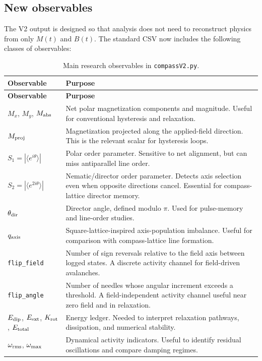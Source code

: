\documentclass[11pt,a4paper]{article}
\newcommand{\code}[1]{\texttt{#1}}
\begin{document}
\subsection{New observables}

The V2 output is designed so that analysis does not need to reconstruct physics from only $M(t)$ and $B(t)$. The standard CSV now includes the following classes of observables:

\begin{longtable}{@{}p{4.2cm}p{10.6cm}@{}}
\caption{Main research observables in \code{compassV2.py}.}\label{tab:v2obs}\\
\toprule
\textbf{Observable} & \textbf{Purpose}\\
\midrule
\endfirsthead
\toprule
\textbf{Observable} & \textbf{Purpose}\\
\midrule
\endhead
\bottomrule
\endfoot
$M_x$, $M_y$, $M_{\rm abs}$ & Net polar magnetization components and magnitude. Useful for conventional hysteresis and relaxation.\\
$M_{\rm proj}$ & Magnetization projected along the applied-field direction. This is the relevant scalar for hysteresis loops.\\
$S_1=|\langle e^{i\theta}\rangle|$ & Polar order parameter. Sensitive to net alignment, but can miss antiparallel line order.\\
$S_2=|\langle e^{2i\theta}\rangle|$ & Nematic/director order parameter. Detects axis selection even when opposite directions cancel. Essential for compass-lattice director memory.\\
$\theta_{\rm dir}$ & Director angle, defined modulo $\pi$. Used for pulse-memory and line-order studies.\\
$q_{\rm axis}$ & Square-lattice-inspired axis-population imbalance. Useful for comparison with compass-lattice line formation.\\
\code{flip\_field} & Number of sign reversals relative to the field axis between logged states. A discrete activity channel for field-driven avalanches.\\
\code{flip\_angle} & Number of needles whose angular increment exceeds a threshold. A field-independent activity channel useful near zero field and in relaxation.\\
$E_{\rm dip}$, $E_{\rm ext}$, $K_{\rm rot}$, $E_{\rm total}$ & Energy ledger. Needed to interpret relaxation pathways, dissipation, and numerical stability.\\
$\omega_{\rm rms}$, $\omega_{\rm max}$ & Dynamical activity indicators. Useful to identify residual oscillations and compare damping regimes.\\
\end{longtable}
\end{document}
